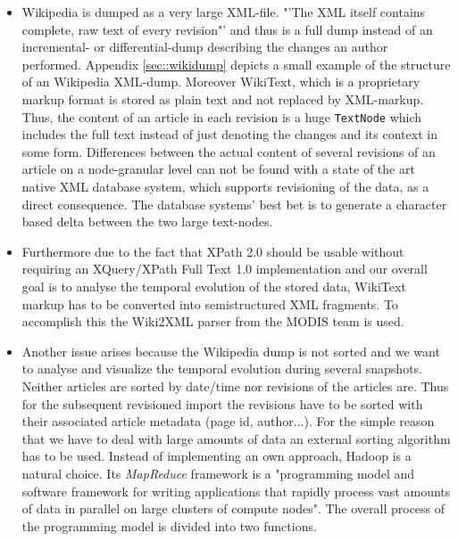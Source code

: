 \begin{itemize}
\item Wikipedia is dumped as a very large XML-file. "'The XML itself contains complete, raw text of every revision"'\cite{WikiDump} and thus is a full dump instead of an incremental- or differential-dump describing the changes an author performed. Appendix \ref{sec::wikidump} depicts a small example of the structure of an Wikipedia XML-dump. Moreover WikiText, which is a proprietary markup format is stored as plain text and not replaced by XML-markup. Thus, the content of an article in each revision is a huge \texttt{TextNode} which includes the full text instead of just denoting the changes and its context in some form. Differences between the actual content of several revisions of an article on a node-granular level can not be found with a state of the art native XML database system, which supports revisioning of the data, as a direct consequence. The database systems' best bet is to generate a character based delta between the two large text-nodes.

\item Furthermore due to the fact that XPath 2.0 should be usable without requiring an XQuery/XPath Full Text 1.0 implementation and our overall goal is to analyse the temporal evolution of the stored data, WikiText markup has to be converted into semistructured XML fragments. To accomplish this the Wiki2XML parser from the MODIS team \cite{Wiki2XML} is used.

\item Another issue arises because the Wikipedia dump is not sorted and we want to analyse and visualize the temporal evolution during several snapshots. Neither articles are sorted by date/time nor revisions of the articles are. Thus for the subsequent revisioned import the revisions have to be sorted with their associated article metadata (page id, author...). For the simple reason that we have to deal with large amounts of data an external sorting algorithm has to be used. Instead of implementing an own approach, Hadoop is a natural choice. Its \emph{MapReduce}\cite{Hadoop} framework is a "programming model and software framework for writing applications that rapidly process vast amounts of data in parallel on large clusters of compute nodes". The overall process of the programming model is divided into two functions.
\end{itemize}

